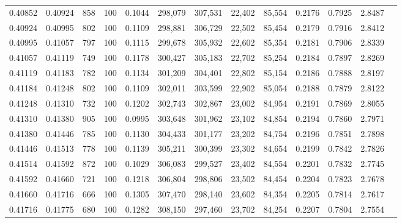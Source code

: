 \begin{tabular}{rrrrrrrrrrrrr}
0.40852 & 0.40924 &   858 & 100 &                                     0.1044 & 298,079 & 307,531 &  22,402 &  85,554 & 0.2176 & 0.7925 & 2.8487 \\
0.40924 & 0.40995 &   802 & 100 &                                     0.1109 & 298,881 & 306,729 &  22,502 &  85,454 & 0.2179 & 0.7916 & 2.8412 \\
0.40995 & 0.41057 &   797 & 100 &                                     0.1115 & 299,678 & 305,932 &  22,602 &  85,354 & 0.2181 & 0.7906 & 2.8339 \\
0.41057 & 0.41119 &   749 & 100 &                                     0.1178 & 300,427 & 305,183 &  22,702 &  85,254 & 0.2184 & 0.7897 & 2.8269 \\
0.41119 & 0.41183 &   782 & 100 &                                     0.1134 & 301,209 & 304,401 &  22,802 &  85,154 & 0.2186 & 0.7888 & 2.8197 \\
0.41184 & 0.41248 &   802 & 100 &                                     0.1109 & 302,011 & 303,599 &  22,902 &  85,054 & 0.2188 & 0.7879 & 2.8122 \\
0.41248 & 0.41310 &   732 & 100 &                                     0.1202 & 302,743 & 302,867 &  23,002 &  84,954 & 0.2191 & 0.7869 & 2.8055 \\
0.41310 & 0.41380 &   905 & 100 &                                     0.0995 & 303,648 & 301,962 &  23,102 &  84,854 & 0.2194 & 0.7860 & 2.7971 \\
0.41380 & 0.41446 &   785 & 100 &                                     0.1130 & 304,433 & 301,177 &  23,202 &  84,754 & 0.2196 & 0.7851 & 2.7898 \\
0.41446 & 0.41513 &   778 & 100 &                                     0.1139 & 305,211 & 300,399 &  23,302 &  84,654 & 0.2199 & 0.7842 & 2.7826 \\
0.41514 & 0.41592 &   872 & 100 &                                     0.1029 & 306,083 & 299,527 &  23,402 &  84,554 & 0.2201 & 0.7832 & 2.7745 \\
0.41592 & 0.41660 &   721 & 100 &                                     0.1218 & 306,804 & 298,806 &  23,502 &  84,454 & 0.2204 & 0.7823 & 2.7678 \\
0.41660 & 0.41716 &   666 & 100 &                                     0.1305 & 307,470 & 298,140 &  23,602 &  84,354 & 0.2205 & 0.7814 & 2.7617 \\
0.41716 & 0.41775 &   680 & 100 &                                     0.1282 & 308,150 & 297,460 &  23,702 &  84,254 & 0.2207 & 0.7804 & 2.7554 \\

\end{tabular}
